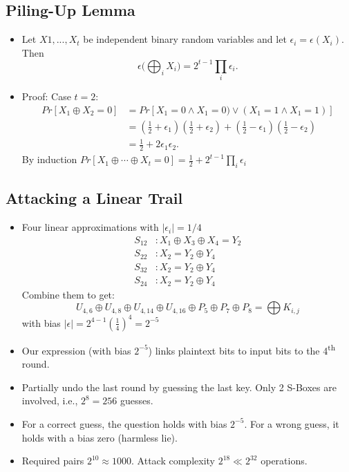 \documentclass[a4paper]{scrartcl}
\newcommand{\ts}{\textsuperscript}
\begin{document}
\subsection*{Piling-Up Lemma}

\begin{itemize}
\item Let $X1, ..., X_t$ be independent binary random variables and let $\epsilon_i = \epsilon(X_i)$. Then $$\epsilon \Bigg(\bigoplus_{i}X_i\Bigg) = 2^{t-1} \prod_{i} \epsilon_i .$$ 
\item Proof: Case $t = 2$:
\begin{align*}
Pr[X_1 \oplus X_2 = 0] &= Pr[X_1 = 0 \land X_1 = 0) \lor (X_1 = 1 \land X_1 = 1)]\\
&= (\frac{1}{2} + \epsilon_1)(\frac{1}{2} + \epsilon_2)+(\frac{1}{2} - \epsilon_1)(\frac{1}{2} - \epsilon_2)\\
&=\frac{1}{2} + 2\epsilon_1 \epsilon_2.
\end{align*}
By induction $Pr[X_1 \oplus \cdots \oplus X_t = 0] = \frac{1}{2} + 2^{t-1}\prod_{i} \epsilon_i$
\end{itemize}
\subsection*{Attacking a Linear Trail}
\begin{itemize}
\item Four linear approximations with $|\epsilon_i| = 1/4$
\begin{align*}
S_{12} &: X_1 \oplus X_3 \oplus X_4 = Y_2\\
S_{22} &: X_2 = Y_2 \oplus Y_4\\
S_{32} &: X_2 = Y_2 \oplus Y_4\\
S_{24} &: X_2 = Y_2 \oplus Y_4
\end{align*}
Combine them to get:
$$U_{4,6} \oplus U_{4,8} \oplus U_{4,14} \oplus U_{4,16} \oplus P_5 \oplus P_7 \oplus P_8 = \bigoplus K_{i,j}$$
with bias $|\epsilon| = 2^{4-1}(\frac{1}{4})^4 = 2^{-5}$
\item Our expression (with bias $2^{-5}$) links plaintext bits to input bits to the 4\ts{th} round.
\item Partially undo the last round by guessing the last key. Only 2 S-Boxes are involved, i.e., $2^8 = 256$ guesses.
\item For a correct guess, the question holds with bias $2^{-5}$. For a wrong guess, it holds with a bias zero (harmless lie).
\item Required pairs $2^{10} \approx 1000$. Attack complexity $2^{18} \ll 2^{32}$ operations.
\end{itemize}
\end{document}
